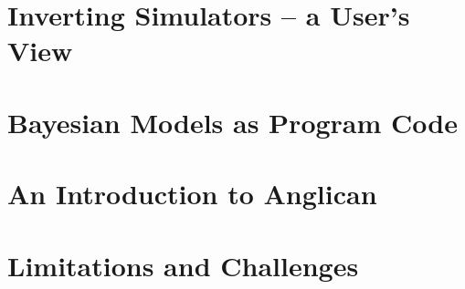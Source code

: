\section{Inverting Simulators -- a User's View}
\label{sec:probprog:inv}

\section{Bayesian Models as Program Code}
\label{sec:probprog:models}

\section{An Introduction to Anglican}
\label{sec:probprog:anglican}

\section{Limitations and Challenges}
\label{sec:probprog:limit}
